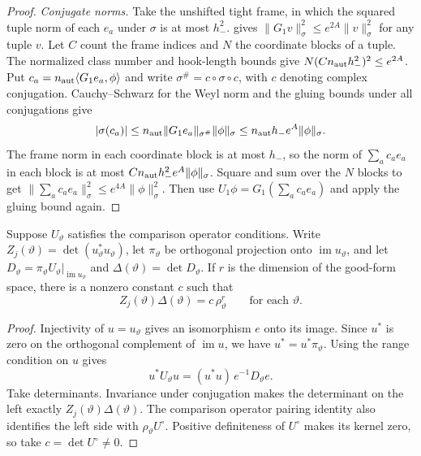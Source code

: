 \begin{proof}
\emph{Conjugate norms.}
Take the unshifted tight frame, in which the squared tuple norm of each $e_a$ under $\sigma$ is at most $h_-^2$.  gives $\|G_1v\|_\sigma^2\le e^{2A}\|v\|_\sigma^2$ for any tuple $v$. Let $C$ count the frame indices and $N$ the coordinate blocks of a tuple. The normalized class number and hook-length bounds give $N(Cn_{\rm aut}h_-^2)^2\le e^{2A}$. Put $c_a=n_{\rm aut}\langle G_1e_a,\phi\rangle$ and write $\sigma^\#=c\circ\sigma\circ c$, with $c$ denoting complex conjugation. Cauchy--Schwarz for the Weyl norm and the gluing bounds under all conjugations give
\[
 |\sigma(c_a)|\le n_{\rm aut}\|G_1e_a\|_{\sigma^\#}\|\phi\|_\sigma
             \le n_{\rm aut}h_-e^A\|\phi\|_\sigma .
\]
The frame norm in each coordinate block is at most $h_-$, so the norm of $\sum_a c_a e_a$ in each block is at most $Cn_{\rm aut}h_-^2e^A\|\phi\|_\sigma$. Square and sum over the $N$ blocks to get $\|\sum_a c_a e_a\|_\sigma^2\le e^{4A}\|\phi\|_\sigma^2$. Then use $U_1\phi=G_1(\sum_a c_a e_a)$ and apply the gluing bound again.
\end{proof}

\begin{lemma}
\label{lem:c-compression-identity}
\emitthmsource
Suppose $U_\vartheta$ satisfies the comparison operator conditions. Write $Z_j(\vartheta)=\det(u_\vartheta^*u_\vartheta)$, let $\pi_\vartheta$ be orthogonal projection onto $\operatorname{im}u_\vartheta$, and let $D_\vartheta=\pi_\vartheta U_\vartheta|_{\operatorname{im}u_\vartheta}$ and $\Delta(\vartheta)=\det D_\vartheta$. If $r$ is the dimension of the good-form space, there is a nonzero constant $c$ such that
\begin{equation}
 Z_j(\vartheta)\Delta(\vartheta)=c\,\rho_\vartheta^r
 \qquad\text{for each }\vartheta .
\label{eq:c-compression}
\end{equation}
\end{lemma}
\begin{proof}
Injectivity of $u=u_\vartheta$ gives an isomorphism $e$ onto its image. Since $u^*$ is zero on the orthogonal complement of $\operatorname{im}u$, we have $u^*=u^*\pi_\vartheta$. Using the range condition on $u$ gives
\[
 u^*U_\vartheta u=(u^*u)\,e^{-1}D_\vartheta e .
\]
Take determinants. Invariance under conjugation makes the determinant on the left exactly $Z_j(\vartheta)\Delta(\vartheta)$. The comparison operator pairing identity also identifies the left side with $\rho_\vartheta U^\circ$. Positive definiteness of $U^\circ$ makes its kernel zero, so take $c=\det U^\circ\ne0$.
\end{proof}

